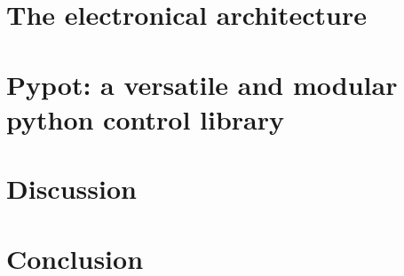 \section{The electronical architecture} %

\section{Pypot: a versatile and modular python control library}

\section{Discussion}

\section{Conclusion}

